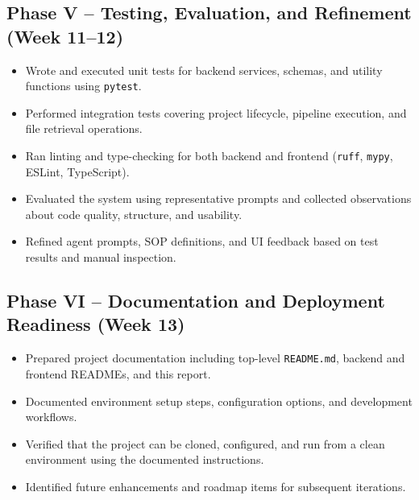 \subsection*{Phase V -- Testing, Evaluation, and Refinement (Week 11--12)}
\begin{itemize}
    \item Wrote and executed unit tests for backend services, schemas, and utility functions using \texttt{pytest}.
    \item Performed integration tests covering project lifecycle, pipeline execution, and file retrieval operations.
    \item Ran linting and type-checking for both backend and frontend (\texttt{ruff}, \texttt{mypy}, ESLint, TypeScript).
    \item Evaluated the system using representative prompts and collected observations about code quality, structure, and usability.
    \item Refined agent prompts, SOP definitions, and UI feedback based on test results and manual inspection.
\end{itemize}

\subsection*{Phase VI -- Documentation and Deployment Readiness (Week 13)}
\begin{itemize}
    \item Prepared project documentation including top-level \texttt{README.md}, backend and frontend READMEs, and this report.
    \item Documented environment setup steps, configuration options, and development workflows.
    \item Verified that the project can be cloned, configured, and run from a clean environment using the documented instructions.
    \item Identified future enhancements and roadmap items for subsequent iterations.
\end{itemize}
